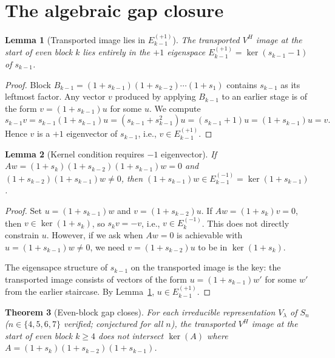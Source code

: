 \documentclass[12pt]{article}
\newtheorem{theorem}{Theorem}
\newtheorem{lemma}[theorem]{Lemma}
\theoremstyle{definition}
\begin{document}
\section{The algebraic gap closure}

\begin{lemma}[Transported image lies in $E_{k-1}^{(+1)}$]\label{lem:eig}
The transported $V^H$ image at the start of even block $k$ lies entirely in the
$+1$ eigenspace $E_{k-1}^{(+1)} = \ker(s_{k-1} - 1)$ of $s_{k-1}$.
\end{lemma}

\begin{proof}
Block $B_{k-1} = (1+s_{k-1})(1+s_{k-2})\cdots(1+s_1)$ contains $s_{k-1}$ as its
leftmost factor. Any vector $v$ produced by applying $B_{k-1}$ to an earlier stage is
of the form $v = (1+s_{k-1}) u$ for some $u$. We compute
\[
  s_{k-1} v = s_{k-1}(1 + s_{k-1}) u = (s_{k-1} + s_{k-1}^2) u = (s_{k-1} + 1) u
             = (1 + s_{k-1}) u = v.
\]
Hence $v$ is a $+1$ eigenvector of $s_{k-1}$, i.e., $v \in E_{k-1}^{(+1)}$.
\end{proof}

\begin{lemma}[Kernel condition requires $-1$ eigenvector]\label{lem:ker}
If $A w = (1+s_k)(1+s_{k-2})(1+s_{k-1}) w = 0$ and $(1+s_{k-2})(1+s_{k-1}) w \ne 0$,
then $(1+s_{k-1}) w \in E_{k-1}^{(-1)} = \ker(1 + s_{k-1})$.
\end{lemma}

\begin{proof}
Set $u = (1+s_{k-1}) w$ and $v = (1+s_{k-2}) u$. If $Aw = (1+s_k) v = 0$,
then $v \in \ker(1 + s_k)$, so $s_k v = -v$, i.e., $v \in E_k^{(-1)}$.
This does not directly constrain $u$. However, if we ask when $A w = 0$ is achievable
with $u = (1+s_{k-1}) w \ne 0$, we need $v = (1+s_{k-2}) u$ to be in $\ker(1+s_k)$.

The eigensapce structure of $s_{k-1}$ on the transported image is the key:
the transported image consists of vectors of the form $u = (1+s_{k-1}) w'$ for
some $w'$ from the earlier staircase. By Lemma~\ref{lem:eig}, $u \in E_{k-1}^{(+1)}$.
\end{proof}

\begin{theorem}[Even-block gap closes]\label{thm:main}
For each irreducible representation $V_\lambda$ of $S_n$
($n \in \{4, 5, 6, 7\}$ verified; conjectured for all $n$),
the transported $V^H$ image at the start of even block $k \ge 4$ does not intersect
$\ker(A)$ where $A = (1+s_k)(1+s_{k-2})(1+s_{k-1})$.
\end{theorem}
\end{document}
